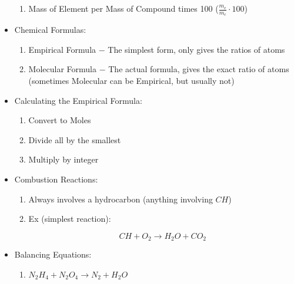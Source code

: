 \documentclass[12pt]{article}
\begin{document}
\begin{itemize}
\begin{enumerate}
      \item Mass of Element per Mass of Compound times 100 ($\frac{m_e}{m_c}\cdot100$)

    \end{enumerate}

  \item Chemical Formulas:

    \begin{enumerate}

      \item Empirical Formula $-$ The simplest form, only gives the ratios of atoms

      \item Molecular Formula $-$ The actual formula, gives the exact ratio of atoms (sometimes Molecular can be Empirical, but usually not)

    \end{enumerate}

  \item Calculating the Empirical Formula:

    \begin{enumerate}

      \item Convert to Moles

      \item Divide all by the smallest

      \item Multiply by integer

    \end{enumerate}

  \item Combustion Reactions:

    \begin{enumerate}

      \item Always involves a hydrocarbon (anything involving $CH$)

      \item Ex (simplest reaction):

      $$CH+O_2\rightarrow H_2O +CO_2$$

    \end{enumerate}

  \item Balancing Equations:

    \begin{enumerate}

      \item $N_2H_4+N_2O_4\rightarrow N_2+H_2O$


\end{enumerate}
\end{itemize}
\end{document}

